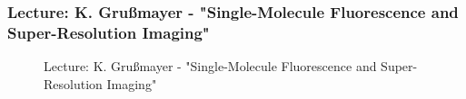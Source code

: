\documentclass[11pt,a4paper]{article}
\numberwithin{equation}{section}
\numberwithin{table}{section}\setlength{\multlinegap}{25pt}
\begin{document}
\subsubsection{Lecture: K. Gru{\ss}mayer - "Single-Molecule Fluorescence and Super-Resolution Imaging"}

\begin{figure}[H]
\centering
\null\hfill %
\hfill %
\hfill %
\hfill %
\hfill\null %
\caption{Lecture: K. Gru{\ss}mayer - "Single-Molecule Fluorescence and Super-Resolution Imaging"}
\end{figure}
\end{document}
